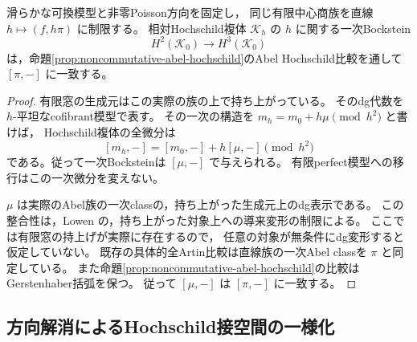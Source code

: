 \begin{lemma}[実際の族のHochschild一次微分]
\label{lem:hochschild-first-bockstein}
滑らかな可換模型と非零Poisson方向を固定し，
同じ有限中心商族を直線 $h\mapsto(f,h\pi)$ に制限する。
相対Hochschild複体 $\mathcal K_h$ の $h$ に関する一次Bockstein
\[
 H^2(\mathcal K_0)\longrightarrow H^3(\mathcal K_0)
\]
は，命題\ref{prop:noncommutative-abel-hochschild}のAbel Hochschild比較を通して
$[\pi,-]$ に一致する。
\end{lemma}
\begin{proof}
有限窓の生成元はこの実際の族の上で持ち上がっている。
そのdg代数を $h$-平坦なcofibrant模型で表す。
その一次の構造を $m_h=m_0+h\mu\pmod{h^2}$ と書けば，
Hochschild複体の全微分は
\[
 [m_h,-]=[m_0,-]+h[\mu,-]\pmod{h^2}
\]
である。従って一次Bocksteinは $[\mu,-]$ で与えられる。
有限perfect模型への移行はこの一次微分を変えない。

$\mu$ は実際のAbel族の一次classの，持ち上がった生成元上のdg表示である。
この整合性は，Lowen
\cite[Theorems~3.22, 4.18, Remark~4.20]{LowenCharacteristic2008}
の，持ち上がった対象上への導来変形の制限による。
ここでは有限窓の持上げが実際に存在するので，
任意の対象が無条件にdg変形すると仮定していない。
既存の具体的全Artin比較は直線族の一次Abel classを $\pi$ と同定している。
また命題\ref{prop:noncommutative-abel-hochschild}の比較はGerstenhaber括弧を保つ。
従って $[\mu,-]$ は $[\pi,-]$ に一致する。
\end{proof}

\subsection{方向解消によるHochschild接空間の一様化}

